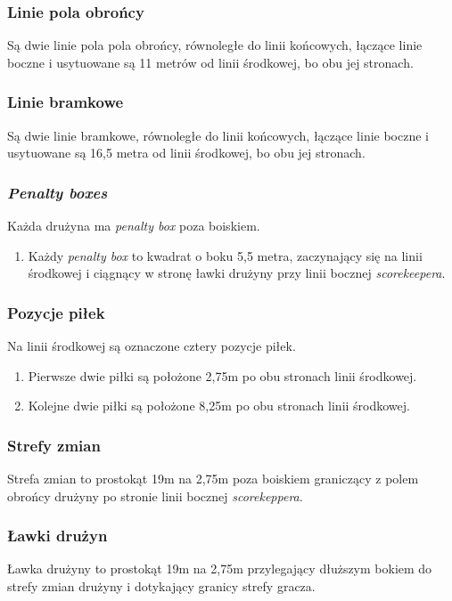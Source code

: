 \documentclass[11pt,a4paper]{article}
\begin{document}
\subsubsection{Linie pola obrońcy}
Są dwie linie pola pola obrońcy, równoległe do linii końcowych, łączące linie boczne i usytuowane są 11 metrów od linii środkowej, bo obu jej stronach.

\subsubsection{Linie bramkowe}
Są dwie linie bramkowe, równoległe do linii końcowych, łączące linie boczne i usytuowane są 16,5 metra od linii środkowej, bo obu jej stronach.

\subsubsection{\emph{Penalty boxes}}
Każda drużyna ma \emph{penalty box} poza boiskiem.
\begin{enumerate}
  \item Każdy \emph{penalty box} to kwadrat o boku 5,5 metra, zaczynający się na linii środkowej i ciągnący w stronę ławki drużyny przy linii bocznej \emph{scorekeepera}.
\end{enumerate}

\subsubsection{Pozycje piłek}
Na linii środkowej są oznaczone cztery pozycje piłek.
\begin{enumerate}
  \item Pierwsze dwie piłki są położone 2,75m po obu stronach linii środkowej.
  \item Kolejne dwie piłki są położone 8,25m po obu stronach linii środkowej.
\end{enumerate}

\subsubsection{Strefy zmian}
Strefa zmian to prostokąt 19m na 2,75m poza boiskiem graniczący z polem obrońcy drużyny po stronie linii bocznej \emph{scorekeppera}.

\subsubsection{Ławki drużyn}
Ławka drużyny to prostokąt 19m na 2,75m przylegający dłuższym bokiem do strefy zmian drużyny i dotykający granicy strefy gracza.
\end{document}
